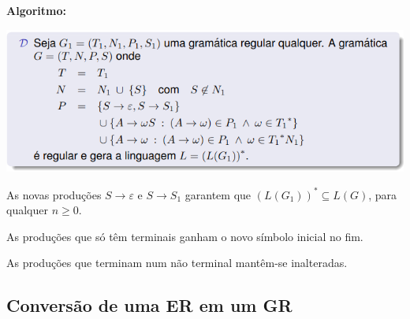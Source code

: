 \documentclass{article}
\begin{document}
\begin{flushleft}
  \item \textbf{Algoritmo:}
  
  \begin{center}
    \includegraphics[scale=0.4]{13}
  \end{center}

  \item As novas produções $S \rightarrow \varepsilon$ e $S \rightarrow S_1$ garantem que
  $(L(G_1))^* \subseteq L(G)$, para qualquer $n \ge 0$.
  \item As produções que só têm terminais ganham o novo símbolo inicial no fim.
  \item As produções que terminam num não terminal mantêm-se inalteradas.
\end{flushleft}

\pagebreak

\subsection{Conversão de uma ER em um GR}
\end{document}
